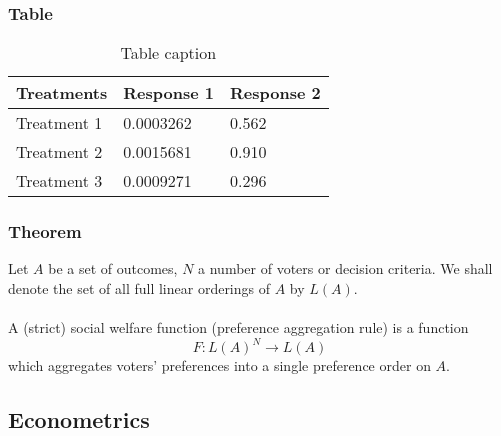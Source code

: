 \documentclass[aspectratio=169,xcolor=dvipsnames]{beamer}
\begin{document}
\begin{frame}
    \frametitle{Table}
    \begin{table}[H] %
        \begin{tabular}{l l l} \hline
            \textbf{Treatments} & \textbf{Response 1} & \textbf{Response 2} \\ \hline \hline
            Treatment 1         & 0.0003262           & 0.562               \\
            Treatment 2         & 0.0015681           & 0.910               \\
            Treatment 3         & 0.0009271           & 0.296               \\ \hline
        \end{tabular}
        \caption{Table caption}
    \end{table}

\end{frame}


\begin{frame}
    \frametitle{Theorem}
    \begin{theorem}
        Let $A$ be a set of outcomes, $N$ a number of voters or decision criteria. We shall denote the set of all full linear orderings of $A$ by $L(A)$.\\~\\

        A (strict) social welfare function (preference aggregation rule) is a function
        \begin{equation}
            F: L(A)^N \longrightarrow L(A)
        \end{equation}
        which aggregates voters' preferences into a single preference order on $A$.
    \end{theorem}
\end{frame}


\subsection{Econometrics}

\end{document}
